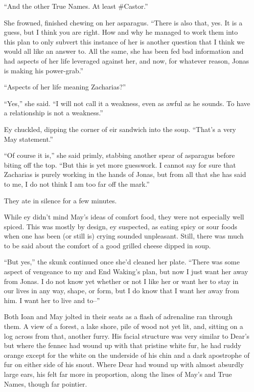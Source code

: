 ``And the other True Names. At least \#Castor.''

She frowned, finished chewing on her asparagus. ``There is also that, yes. It is a guess, but I think you are right. How and why he managed to work them into this plan to only subvert this instance of her is another question that I think we would all like an answer to. All the same, she has been fed bad information and had aspects of her life leveraged against her, and now, for whatever reason, Jonas is making his power-grab.''

``Aspects of her life meaning Zacharias?''

``Yes,'' she said. ``I will not call it a weakness, even as awful as he sounds. To have a relationship is not a weakness.''

Ey chuckled, dipping the corner of eir sandwich into the soup. ``That's a very May statement.''

``Of course it is,'' she said primly, stabbing another spear of asparagus before biting off the top. ``But this is yet more guesswork. I cannot say for sure that Zacharias is purely working in the hands of Jonas, but from all that she has said to me, I do not think I am too far off the mark.''

They ate in silence for a few minutes.

While ey didn't mind May's ideas of comfort food, they were not especially well spiced. This was mostly by design, ey suspected, as eating spicy or sour foods when one has been (or still is) crying sounded unpleasant. Still, there was much to be said about the comfort of a good grilled cheese dipped in soup.

``But yes,'' the skunk continued once she'd cleaned her plate. ``There was some aspect of vengeance to my and End Waking's plan, but now I just want her away from Jonas. I do not know yet whether or not I like her or want her to stay in our lives in any way, shape, or form, but I do know that I want her away from him. I want her to live and to--''

Both Ioan and May jolted in their seats as a flash of adrenaline ran through them. A view of a forest, a lake shore, pile of wood not yet lit, and, sitting on a log across from that, another furry. His facial structure was very similar to Dear's but where the fennec had wound up with that pristine white fur, he had ruddy orange except for the white on the underside of his chin and a dark apostrophe of fur on either side of his snout. Where Dear had wound up with almost absurdly large ears, his felt far more in proportion, along the lines of May's and True Names, though far pointier.

